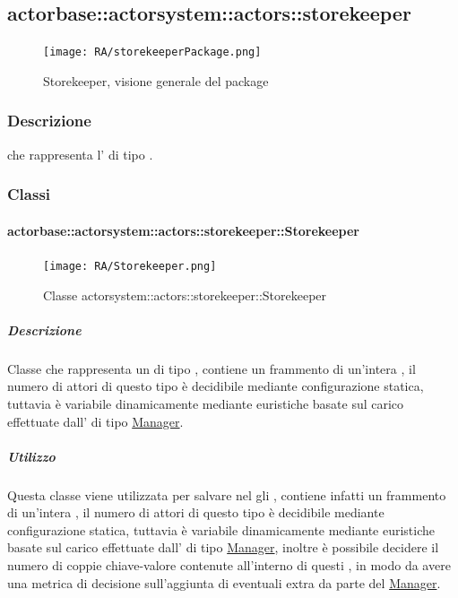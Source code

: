 \documentclass{scalatekids-article}
\begin{document}
\subsection{actorbase::actorsystem::actors::storekeeper}
\label{sec:actorbase::actorsystem::actors::storekeeper}

\begin{figure}[H]
  \begin{center}
    \texttt{[image: RA/storekeeperPackage.png]}
    \caption{Storekeeper, visione generale del package}
  \end{center}
\end{figure}

\subsubsection{Descrizione}
 che rappresenta l' di tipo .

\subsubsection{Classi}

\paragraph{actorbase::actorsystem::actors::storekeeper::Storekeeper}
\label{sec:actorbase::actorsystem::actors::storekeeper::Storekeeper}

\begin{figure}[H]
  \begin{center}
    \texttt{[image: RA/Storekeeper.png]}
    \caption{Classe actorsystem::actors::storekeeper::Storekeeper}
  \end{center}
\end{figure}

\subparagraph{Descrizione}
Classe che rappresenta un  di tipo , contiene
un frammento di un'intera , il numero di attori di questo tipo
è decidibile mediante configurazione statica, tuttavia è variabile dinamicamente
mediante euristiche basate sul carico effettuate dall' di tipo
\hyperref[sec:actorbase::actorsystem::actors::manager::Manager]{Manager}.

\subparagraph{Utilizzo}
Questa classe viene utilizzata per salvare nel  gli
, contiene infatti un frammento di un'intera , il
numero di attori di questo tipo è decidibile mediante configurazione statica,
tuttavia è variabile dinamicamente mediante euristiche basate sul carico
effettuate dall' di tipo
\hyperref[sec:actorbase::actorsytem::actors::manager::Manager]{Manager}, inoltre
è possibile decidere il numero di coppie chiave-valore contenute all'interno di
questi , in modo da avere una metrica di decisione sull'aggiunta
di eventuali  extra da parte del
\hyperref[sec:actorbase::actorsytem::actors::manager::Manager]{Manager}.
\end{document}
